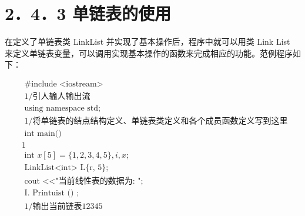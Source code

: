 \documentclass[10pt]{article}
\begin{document}
\section*{2．4．3 单链表的使用}
在定义了单链表类 LinkList 并实现了基本操作后，程序中就可以用类 Link List 来定义单链表变量，可以调用实现基本操作的函数来完成相应的功能。范例程序如下：

$$
\begin{aligned}
& \text { \# include <iostream> } \\
& \text { 1/引人输人输出流 } \\
& \text { using namespace std; } \\
& \text { 1/将单链表的结点结构定义、单链表类定义和各个成员函数定义写到这里 } \\
& \text { int main() } \\
& 1 \\
& \text { int } x[5]=\{1,2,3,4,5\}, i, x \text {; } \\
& \text { LinkList<int> L\{r, 5\}; } \\
& \text { cout <<"当前线性表的数据为: "; } \\
& \text { I. Printuist () ; } \\
& \text { 1/输出当前链表12345 }
\end{aligned}
$$
\end{document}
